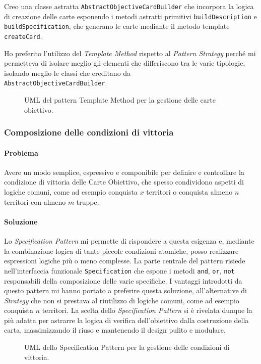 \documentclass[a4paper,12pt]{report}
\begin{document}
Creo una classe astratta \texttt{AbstractObjectiveCardBuilder} che incorpora la logica di creazione delle carte esponendo i metodi astratti primitivi \texttt{buildDescription} e \texttt{buildSpecification}, che generano le carte mediante il metodo template \texttt{createCard}.

Ho preferito l'utilizzo del \textit{Template Method} rispetto al \textit{Pattern Strategy} perché mi permetteva di isolare meglio gli elementi che differiscono tra le varie tipologie, isolando meglio le classi che ereditano da
\\\texttt{AbstractObjectiveCardBuilder}.
\begin{figure}[H]
	\centering
	
	\caption{UML del pattern Template Method per la gestione delle carte obiettivo.}
\end{figure}
\subsubsection{Composizione delle condizioni di vittoria}
\paragraph{Problema}
Avere un modo semplice, espressivo e componibile per definire e controllare la condizione di vittoria delle Carte Obiettivo, che spesso condividono aspetti di logiche comuni, come ad esempio conquista $x$ territori o conquista almeno $n$ territori con almeno $m$ truppe.
\paragraph{Soluzione}
Lo \textit{Specification Pattern} mi permette di rispondere a questa esigenza e, mediante la combinazione logica di tante piccole condizioni atomiche, posso realizzare espressioni logiche più o meno complesse. La parte centrale del pattern risiede nell'interfaccia funzionale \texttt{Specification} che espone i metodi \texttt{and}, \texttt{or}, \texttt{not} responsabili della composizione delle varie specifiche.
I vantaggi introdotti da questo pattern mi hanno portato a preferire questa soluzione, all'alternative di \textit{Strategy} che non si prestava al riutilizzo di logiche comuni, come ad esempio conquista $n$ territori.
La scelta dello \textit{Specification Pattern} si è rivelata dunque la più adatta per astrarre la logica di verifica dell'obiettivo dalla costruzione della carta, massimizzando il riuso e mantenendo il design pulito e modulare.
\begin{figure}[H]
	\centering
	
	\caption{UML dello Specification Pattern per la gestione delle condizioni di vittoria.}
\end{figure}
\end{document}
